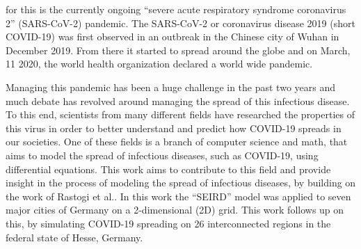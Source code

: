 for this is the currently ongoing ``severe acute respiratory syndrome coronavirus 2'' (SARS-CoV-2) pandemic. The SARS-CoV-2 or
coronavirus disease 2019 (short COVID-19) was first observed in an outbreak in the Chinese city of Wuhan in December 2019\cite{??}.
From there it started to spread around the globe and on March, 11 2020, the world health organization declared a world wide pandemic\cite{??}.\newline
\par
Managing this pandemic has been a huge challenge in the past two years and much debate has revolved around managing the spread of this
infectious disease. To this end, scientists from many different fields have researched the properties of this virus in order to better
understand and predict how COVID-19 spreads in our societies. One of these fields is a branch of computer science and math, that aims to
model the spread of infectious diseases, such as  COVID-19, using differential equations. This work aims to contribute to this field and
provide insight in the process of modeling the spread of infectious diseases, by building on the work of Rastogi et al.\cite{rastogi}.
In this work the ``SEIRD'' model\cite{wittum} was applied to seven major cities of Germany on a 2-dimensional (2D) grid. This work
follows up on this, by simulating COVID-19 spreading on 26 interconnected regions in the federal state of Hesse, Germany.



